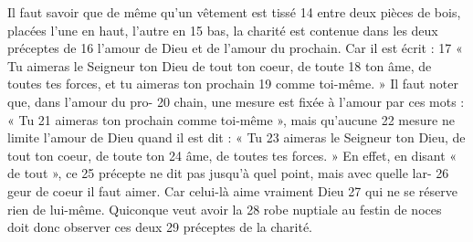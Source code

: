 Il faut savoir que de même qu'un vêtement est tissé	 
14	 	entre deux pièces de bois, placées l'une en haut, l'autre en	 
15	 	bas, la charité est contenue dans les deux préceptes de	 
16	 	l'amour de Dieu et de l'amour du prochain. Car il est écrit :	 
17	 	« Tu aimeras le Seigneur ton Dieu de tout ton coeur, de toute	 
18	 	ton âme, de toutes tes forces, et tu aimeras ton prochain	 
19	 	comme toi-même. » Il faut noter que, dans l'amour du pro-	 
20	 	chain, une mesure est fixée à l'amour par ces mots : « Tu	 
21	 	aimeras ton prochain comme toi-même », mais qu'aucune	 
22	 	mesure ne limite l'amour de Dieu quand il est dit : « Tu	 
23	 	aimeras le Seigneur ton Dieu, de tout ton coeur, de toute ton	 
24	 	âme, de toutes tes forces. » En effet, en disant « de tout », ce	 
25	 	précepte ne dit pas jusqu'à quel point, mais avec quelle lar-	 
26	 	geur de coeur il faut aimer. Car celui-là aime vraiment Dieu	 
27	 	qui ne se réserve rien de lui-même. Quiconque veut avoir la	 
28	 	robe nuptiale au festin de noces doit donc observer ces deux	 
29	 	préceptes de la charité.